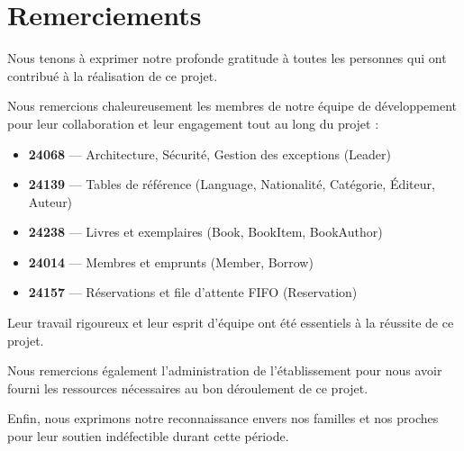 \documentclass[12pt,a4paper,twoside]{report}
\begin{document}
\chapter*{Remerciements}

Nous tenons à exprimer notre profonde gratitude à toutes les personnes qui ont contribué à la réalisation de ce projet.

Nous remercions chaleureusement les membres de notre équipe de développement pour leur collaboration et leur engagement tout au long du projet :

\begin{itemize}
    \item \textbf{24068} — Architecture, Sécurité, Gestion des exceptions (Leader)
    \item \textbf{24139} — Tables de référence (Language, Nationalité, Catégorie, Éditeur, Auteur)
    \item \textbf{24238} — Livres et exemplaires (Book, BookItem, BookAuthor)
    \item \textbf{24014} — Membres et emprunts (Member, Borrow)
    \item \textbf{24157} — Réservations et file d'attente FIFO (Reservation)
\end{itemize}

Leur travail rigoureux et leur esprit d'équipe ont été essentiels à la réussite de ce projet.

Nous remercions également l'administration de l'établissement pour nous avoir fourni les ressources nécessaires au bon déroulement de ce projet.

Enfin, nous exprimons notre reconnaissance envers nos familles et nos proches pour leur soutien indéfectible durant cette période.

\newpage

\tableofcontents
\newpage

\listoffigures
\newpage

\listoftables
\newpage

\end{document}

